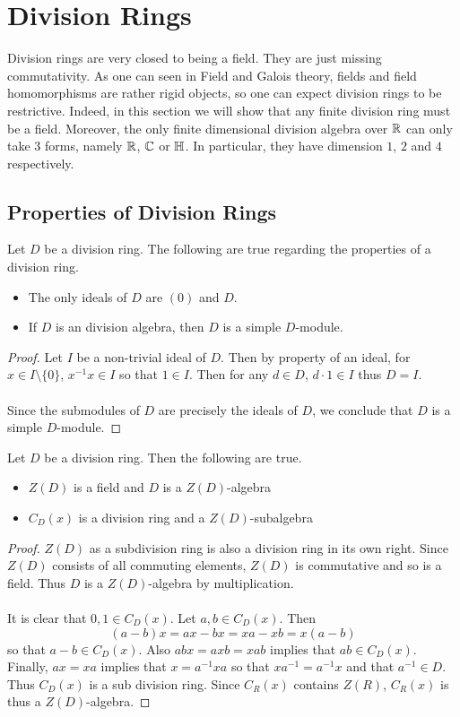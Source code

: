 \documentclass[a4paper]{article}
\begin{document}
\pagebreak

\section{Division Rings}
Division rings are very closed to being a field. They are just missing commutativity. As one can seen in Field and Galois theory, fields and field homomorphisms are rather rigid objects, so one can expect division rings to be restrictive. Indeed, in this section we will show that any finite division ring must be a field. Moreover, the only finite dimensional division algebra over $\mathbb{R}$ can only take $3$ forms, namely $\mathbb{R}$, $\mathbb{C}$ or $\mathbb{H}$. In particular, they have dimension $1$, $2$ and $4$ respectively. 

\subsection{Properties of Division Rings}
\begin{prp}{}{} Let $D$ be a division ring. The following are true regarding the properties of a division ring. 
\begin{itemize}
\item The only ideals of $D$ are $(0)$ and $D$. 
\item If $D$ is an division algebra, then $D$ is a simple $D$-module. 
\end{itemize} \tcbline
\begin{proof}
Let $I$ be a non-trivial ideal of $D$. Then by property of an ideal, for $x\in I\setminus\{0\}$, $x^{-1}x\in I$ so that $1\in I$. Then for any $d\in D$, $d\cdot 1\in I$ thus $D=I$. \\~\\

Since the submodules of $D$ are precisely the ideals of $D$, we conclude that $D$ is a simple $D$-module. 
\end{proof}
\end{prp}

\begin{lmm}{}{} Let $D$ be a division ring. Then the following are true. 
\begin{itemize}
\item $Z(D)$ is a field and $D$ is a $Z(D)$-algebra
\item $C_D(x)$ is a division ring and a $Z(D)$-subalgebra
\end{itemize} \tcbline
\begin{proof}
$Z(D)$ as a subdivision ring is also a division ring in its own right. Since $Z(D)$ consists of all commuting elements, $Z(D)$ is commutative and so is a field. Thus $D$ is a $Z(D)$-algebra by multiplication. \\~\\

It is clear that $0,1\in C_D(x)$. Let $a,b\in C_D(x)$. Then $$(a-b)x=ax-bx=xa-xb=x(a-b)$$ so that $a-b\in C_D(x)$. Also $abx=axb=xab$ implies that $ab\in C_D(x)$. Finally, $ax=xa$ implies that $x=a^{-1}xa$ so that $xa^{-1}=a^{-1}x$ and that $a^{-1}\in D$. Thus $C_D(x)$ is a sub division ring. Since $C_R(x)$ contains $Z(R)$, $C_R(x)$ is thus a $Z(D)$-algebra. 
\end{proof}
\end{lmm}
\end{document}
